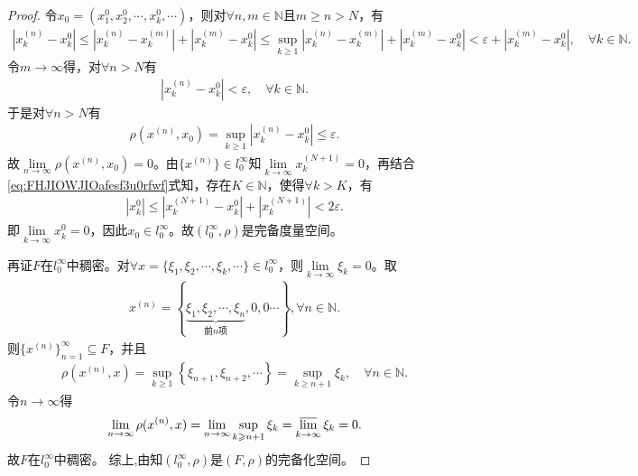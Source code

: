 \documentclass[../../main.tex]{subfiles}%
\begin{document}
\begin{proof}
令$x_0=(x_1^0,x_2^0,\cdots,x_k^0,\cdots)$，则对$\forall n,m\in\mathbb{N}$且$m\geqslant n>N$，有
\begin{align*}
\left|x_k^{(n)}-x_k^0\right|\leqslant\left|x_k^{(n)}-x_k^{(m)}\right|+\left|x_k^{(m)}-x_k^0\right|\leqslant\sup\limits_{k\geqslant 1}\left|x_k^{(n)}-x_k^{(m)}\right|+\left|x_k^{(m)}-x_k^0\right|<\varepsilon+\left|x_k^{(m)}-x_k^0\right|,\quad \forall k\in\mathbb{N}.
\end{align*}
令$m\rightarrow\infty$得，对$\forall n>N$有
\begin{align}\label{eq:FHJIOWJIOafesf3u0rfwf}
\left|x_k^{(n)}-x_k^0\right|<\varepsilon,\quad \forall k\in\mathbb{N}.
\end{align}
于是对$\forall n>N$有
\begin{align*}
\rho(x^{(n)},x_0)=\sup\limits_{k\geqslant 1}\left|x_k^{(n)}-x_k^0\right|\leqslant\varepsilon.
\end{align*}
故$\lim\limits_{n\rightarrow\infty}\rho(x^{(n)},x_0)=0$。由$\{x^{(n)}\}\in l_0^\infty$知$\lim\limits_{k\rightarrow\infty}x_k^{(N+1)}=0$，再结合\eqref{eq:FHJIOWJIOafesf3u0rfwf}式知，存在$K\in\mathbb{N}$，使得$\forall k>K$，有
\begin{align*}
\left|x_k^0\right|\leqslant\left|x_k^{(N+1)}-x_k^0\right|+\left|x_k^{(N+1)}\right|<2\varepsilon.
\end{align*}
即$\lim\limits_{k\rightarrow\infty}x_k^0=0$，因此$x_0\in l_0^\infty$。故$(l_0^\infty,\rho)$是完备度量空间。

再证$F$在$l_0^\infty$中稠密。对$\forall x=\{\xi_1,\xi_2,\cdots,\xi_k,\cdots\}\in l_0^\infty$，则$\lim\limits_{k\rightarrow\infty}\xi_k=0$。取
\begin{align*}
x^{(n)}=\left\{\underbrace{\xi_1,\xi_2,\cdots,\xi_n}_{\text{前}n\text{项}},0,0\cdots\right\},\forall n\in\mathbb{N}.
\end{align*}
则$\{x^{(n)}\}_{n=1}^{\infty}\subseteq F$，并且
\begin{align*}
\rho(x^{(n)},x)=\sup\limits_{k\geqslant 1}\left\{\xi_{n+1},\xi_{n+2},\cdots\right\}=\sup\limits_{k\geqslant n+1}\xi_k,\quad \forall n\in\mathbb{N}.
\end{align*}
令$n\rightarrow\infty$得
\begin{align*}
\lim\limits_{n\rightarrow\infty}\rho(x^{(n)},x)=\lim\limits_{n\rightarrow\infty}\sup\limits_{k\geqslant n+1}\xi_k=\varlimsup\limits_{k\rightarrow\infty}\xi_k=0.
\end{align*}
故$F$在$l_0^\infty$中稠密。
综上,由知$(l_0^\infty,\rho)$是$(F,\rho)$的完备化空间。

\end{proof}
\end{document}
